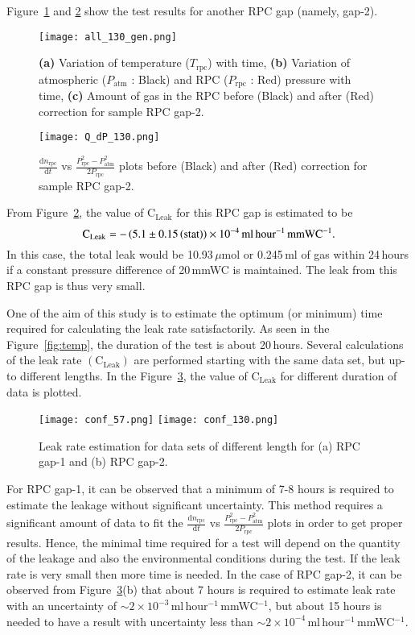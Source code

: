 Figure~\ref{fig:with1} and \ref{fig:qt1} show the test results for another RPC gap (namely, gap-2).
\begin{figure}
  \centering
  \texttt{[image: all\_130\_gen.png]}
  \caption{\textbf{(a)} Variation of temperature ($T_{\textrm{rpc}}$) with time, \textbf{(b)} Variation of atmospheric ($P_{\textrm{atm}}$ : Black) and RPC ($P_{\textrm{rpc}}$ : Red) pressure with time, \textbf{(c)} Amount of gas in the RPC before (Black) and after (Red) correction for sample RPC gap-2.}
  \label{fig:with1}
\end{figure}
\begin{figure}
  \centering
  \texttt{[image: Q\_dP\_130.png]}
  \caption{$\frac{\mathrm{d}n_{\textrm{rpc}}}{\mathrm{d}t}$ vs $\frac{P_{\textrm{rpc}}^{2}-P_{\textrm{atm}}^{2}}{2P_{\textrm{rpc}}}$ plots before (Black) and after (Red) correction for sample RPC gap-2.}
  \label{fig:qt1}
\end{figure}
From Figure~\ref{fig:qt1}, the value of $\textrm{C}_{\textrm{Leak}}$ for this RPC gap is estimated to be
\[\textrm{C}_{\textrm{Leak}}=-\left(5.1\pm 0.15\left(\textrm{stat}\right)\right)\times 10^{-4}\textrm{\,ml\,hour$^{-1}$\,mmWC$^{-1}$}.\]
In this case, the total leak would be 10.93\,$\mu$mol or 0.245\,ml of gas within 24\,hours if a constant pressure difference of 20\,mmWC is maintained. The leak from this RPC gap is thus very small.

One of the aim of this study is to estimate the optimum (or minimum) time required for calculating the leak rate satisfactorily. As seen in the Figure~\ref{fig:temp}, the duration of the test is about 20\,hours. Several calculations of the leak rate $\left(\textrm{C}_{\textrm{Leak}}\right)$ are performed starting with the same data set, but up-to different lengths. In the Figure~\ref{fig:time}, the value of $\textrm{C}_{\textrm{Leak}}$ for different duration of data is plotted.
\begin{figure}
  \centering
  \texttt{[image: conf\_57.png]}
  \vspace*{10pt}
  \texttt{[image: conf\_130.png]}
  \caption{Leak rate estimation for data sets of different length for (a) RPC gap-1 and (b) RPC gap-2.}
  \label{fig:time}
\end{figure}
For RPC gap-1, it can be observed that a minimum of 7-8 hours is required to estimate the leakage without significant uncertainty. This method requires a significant amount of data to fit the $\frac{\mathrm{d}n_{\textrm{rpc}}}{\mathrm{d}t}$ vs $\frac{P_{\textrm{rpc}}^{2}-P_{\textrm{atm}}^{2}}{2P_{\textrm{rpc}}}$ plots in order to get proper results. Hence, the minimal time required for a test will depend on the quantity of the leakage and also the environmental conditions during the test. If the leak rate is very small then more time is needed. In the case of RPC gap-2, it can be observed from Figure~\ref{fig:time}(b) that about 7 hours is required to estimate leak rate with an uncertainty of $\sim 2\times 10^{-3}$\,ml\,hour$^{-1}$\,mmWC$^{-1}$, but about 15 hours is needed to have a result with uncertainty less than $\sim 2\times 10^{-4}$\,ml\,hour$^{-1}$\,mmWC$^{-1}$.

